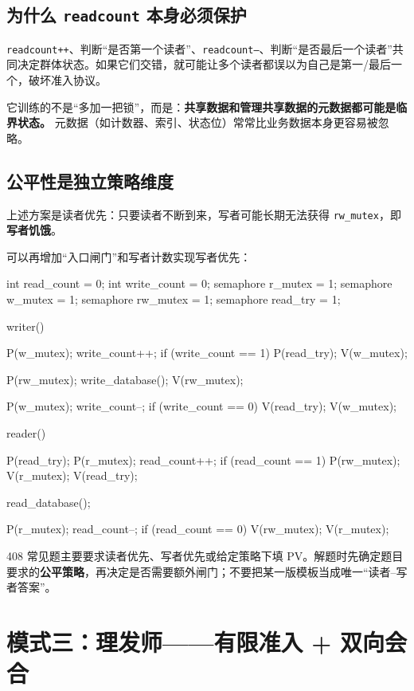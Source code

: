 \documentclass[11pt,a4paper]{ctexart}
\newcommand{\kw}[1]{\textbf{#1}}
\newcommand{\code}[1]{\texttt{#1}}
\begin{document}
\subsection{为什么 \code{readcount} 本身必须保护}

\code{readcount++}、判断“是否第一个读者”、\code{readcount--}、判断“是否最后一个读者”共同决定群体状态。如果它们交错，就可能让多个读者都误以为自己是第一/最后一个，破坏准入协议。

\begin{corebox}[读者--写者真正训练的东西]
它训练的不是“多加一把锁”，而是：\kw{共享数据和管理共享数据的元数据都可能是临界状态。} 元数据（如计数器、索引、状态位）常常比业务数据本身更容易被忽略。
\end{corebox}

\subsection{公平性是独立策略维度}

上述方案是读者优先：只要读者不断到来，写者可能长期无法获得 \code{rw\_mutex}，即\kw{写者饥饿}。

可以再增加“入口闸门”和写者计数实现写者优先：

\begin{codeblock}
int read_count = 0;
int write_count = 0;
semaphore r_mutex = 1;
semaphore w_mutex = 1;
semaphore rw_mutex = 1;
semaphore read_try = 1;

writer() {
    P(w_mutex);
    write_count++;
    if (write_count == 1) P(read_try);
    V(w_mutex);

    P(rw_mutex);
    write_database();
    V(rw_mutex);

    P(w_mutex);
    write_count--;
    if (write_count == 0) V(read_try);
    V(w_mutex);
}

reader() {
    P(read_try);
    P(r_mutex);
    read_count++;
    if (read_count == 1) P(rw_mutex);
    V(r_mutex);
    V(read_try);

    read_database();

    P(r_mutex);
    read_count--;
    if (read_count == 0) V(rw_mutex);
    V(r_mutex);
}
\end{codeblock}

\begin{exam}[考试层次]
408 常见题主要要求读者优先、写者优先或给定策略下填 PV。解题时先确定题目要求的\kw{公平策略}，再决定是否需要额外闸门；不要把某一版模板当成唯一“读者--写者答案”。
\end{exam}

\section{模式三：理发师——有限准入 + 双向会合}
\end{document}
